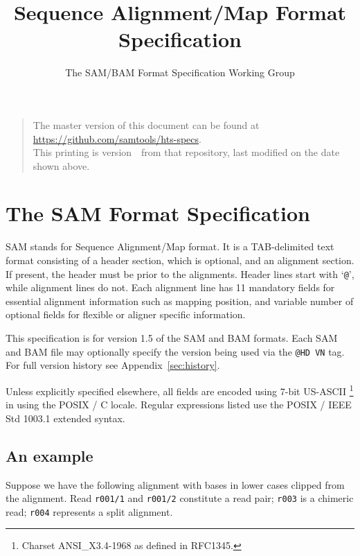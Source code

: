 \documentclass[10pt]{article}
\begin{document}

\title{Sequence Alignment/Map Format Specification}
\author{The SAM/BAM Format Specification Working Group}
\date{\headdate}
\maketitle
\begin{quote}\small
The master version of this document can be found at
\url{https://github.com/samtools/hts-specs}.\\
This printing is version~\commitdesc\ from that repository,
last modified on the date shown above.
\end{quote}
\vspace*{1em}


\section{The SAM Format Specification}
SAM stands for Sequence Alignment/Map format. It is a TAB-delimited text
format consisting of a header section, which is optional, and an
alignment section. If present, the header must be prior to the
alignments. Header lines start with `{\tt @}', while alignment lines do
not. Each alignment line has 11 mandatory fields for essential alignment
information such as mapping position, and variable number of optional
fields for flexible or aligner specific information.

This specification is for version 1.5 of the SAM and BAM formats.  Each SAM and
BAM file may optionally specify the version being used via the
{\tt @HD VN} tag. For full version history see Appendix~\ref{sec:history}. 

Unless explicitly specified elsewhere, all fields are encoded using 7-bit US-ASCII \footnote{Charset ANSI\_X3.4-1968 as defined in RFC1345.} in using the POSIX / C locale.
Regular expressions listed use the POSIX / IEEE Std 1003.1 extended syntax.

\subsection{An example}\label{sec:example}
Suppose we have the following alignment with bases in lower cases
clipped from the alignment. Read {\tt r001/1} and {\tt r001/2}
constitute a read pair; {\tt r003} is a chimeric read; {\tt r004}
represents a split alignment.
\end{document}
